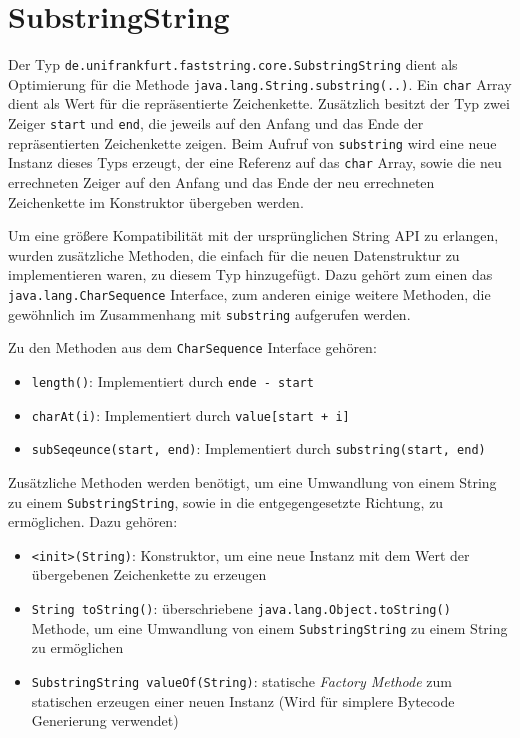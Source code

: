 \section{SubstringString} 

Der Typ \texttt{de.unifrankfurt.faststring.core.SubstringString} dient als Optimierung für
die Methode \texttt{java.lang.String.substring(..)}. Ein \texttt{char} Array dient als
Wert für die repräsentierte Zeichenkette. Zusätzlich besitzt der Typ zwei Zeiger \texttt{start}
und \texttt{end}, die jeweils auf den Anfang und das Ende der repräsentierten Zeichenkette zeigen.
Beim Aufruf von \texttt{substring} wird eine neue Instanz dieses Typs erzeugt, der eine Referenz 
auf das \texttt{char} Array, sowie die neu errechneten Zeiger auf den Anfang und das Ende 
der neu errechneten Zeichenkette im Konstruktor übergeben werden. 

Um eine größere Kompatibilität mit der ursprünglichen String API zu erlangen, wurden zusätzliche
Methoden, die einfach für die neuen Datenstruktur zu implementieren waren, zu diesem Typ hinzugefügt.
Dazu gehört zum einen das \texttt{java.lang.CharSequence} Interface, zum anderen einige 
weitere Methoden, die gewöhnlich im Zusammenhang mit \texttt{substring} aufgerufen werden.

Zu den Methoden aus dem \texttt{CharSequence} Interface gehören:

\begin{itemize}
	\item \texttt{length()}: Implementiert durch \texttt{ende - start}
	\item \texttt{charAt(i)}: Implementiert durch \texttt{value[start + i]}
	\item \texttt{subSeqeunce(start, end)}: Implementiert durch \texttt{substring(start, end)}
\end{itemize}

Zusätzliche Methoden werden benötigt, um eine Umwandlung von einem String zu einem \texttt{SubstringString},
sowie in die entgegengesetzte Richtung, zu ermöglichen. Dazu gehören:

\begin{itemize}
	\item \texttt{<init>(String)}: Konstruktor, um eine neue Instanz mit dem Wert der übergebenen
	Zeichenkette zu erzeugen
	\item \texttt{String toString()}: überschriebene \texttt{java.lang.Object.toString()} Methode,
	um eine Umwandlung von einem \texttt{SubstringString} zu einem String zu ermöglichen
	\item \texttt{SubstringString valueOf(String)}: statische \textit{Factory Methode} zum statischen 
	erzeugen einer neuen Instanz (Wird für simplere Bytecode Generierung verwendet) 
\end{itemize}


